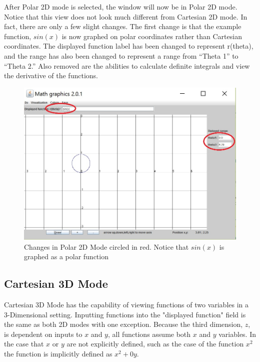 \documentclass{article}[12 pt]
\begin{document}
			After Polar 2D mode is selected, the window will now be in Polar 2D mode. Notice that this view does not look much different from Cartesian 2D mode. In fact, there are only a few slight changes. The first change is that the example function, $sin(x)$ is now graphed on polar coordinates rather than Cartesian coordinates. The displayed function label has been changed to represent r(theta), and the range has also been changed to represent a range from ``Theta 1'' to ``Theta 2.'' Also removed are the abilities to calculate definite integrals and view the derivative of the functions.
				\begin{figure}[h!]
				 \centering
				 \includegraphics[scale=.70]{polarMode}
				 \caption{Changes in Polar 2D Mode circled in red. Notice that $sin(x)$ is graphed as a polar function}
				\end{figure}

	\subsection{Cartesian 3D Mode}
		Cartesian 3D Mode has the capability of viewing functions of two variables in a 3-Dimensional setting. Inputting functions into the "displayed function" field is the same as both 2D modes with one exception. Because the third dimension, $z$, is dependent on inputs to $x$ and $y$, all functions assume both $x$ and $y$ variables. In the case that $x$ or $y$ are not explicitly defined, such as the case of the function $x^2$ the function is implicitly defined as $x^2 + 0y$. 
	
\end{document}
